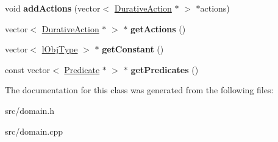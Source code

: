 \begin{DoxyCompactItemize}
\item 
\hypertarget{classDomain_aaa22882bc5494102273bad74524a3cc6}{void {\bfseries add\+Actions} (vector$<$ \hyperlink{classDurativeAction}{Durative\+Action} $\ast$ $>$ $\ast$actions)}\label{classDomain_aaa22882bc5494102273bad74524a3cc6}

\item 
\hypertarget{classDomain_a843c80238424ab370b69df211238ac43}{vector$<$ \hyperlink{classDurativeAction}{Durative\+Action} $\ast$ $>$ $\ast$ {\bfseries get\+Actions} ()}\label{classDomain_a843c80238424ab370b69df211238ac43}

\item 
\hypertarget{classDomain_a743f543dd28fce92e0656206456f6179}{vector$<$ \hyperlink{classlObjType}{l\+Obj\+Type} $>$ $\ast$ {\bfseries get\+Constant} ()}\label{classDomain_a743f543dd28fce92e0656206456f6179}

\item 
\hypertarget{classDomain_ac195417ee0b578b8f041c24b6d5510ce}{const vector$<$ \hyperlink{classPredicate}{Predicate} $\ast$ $>$ $\ast$ {\bfseries get\+Predicates} ()}\label{classDomain_ac195417ee0b578b8f041c24b6d5510ce}

\end{DoxyCompactItemize}


The documentation for this class was generated from the following files\+:\begin{DoxyCompactItemize}
\item 
src/domain.\+h\item 
src/domain.\+cpp\end{DoxyCompactItemize}
